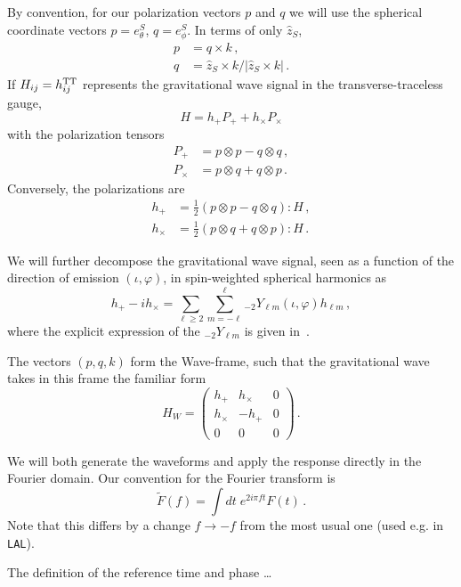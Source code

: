\documentclass[aps,showpacs,twocolumn,prd,superscriptaddress,nofootinbib]{revtex4-1}
\newcommand{\be}{\begin{equation}}
\newcommand{\ee}{\end{equation}}
\newcommand{\bsub}{\begin{subequations}}
\newcommand{\esub}{\end{subequations}}
\begin{document}
By convention, for our polarization vectors $p$ and $q$ we will use the spherical coordinate vectors $p = e_{\theta}^{S}$, $q = e_{\phi}^{S}$. In terms of only $\hat{z}_{S}$,
\bsub
\begin{align}
	p &= q \times k \,,\\
	q &= \hat{z}_{S} \times k / |\hat{z}_{S} \times k|\,.
\end{align}
\esub
If $H_{ij} = h_{ij}^{\rm TT}$ represents the gravitational wave signal in the transverse-traceless gauge,
\be
	H = h_{+} P_{+} + h_{\times} P_{\times}
\ee
with the polarization tensors
\bsub
\begin{align}
	P_{+} &= p \otimes p - q \otimes q \,,\\
	P_{\times} &= p \otimes q + q \otimes p \,.
\end{align}
\esub
Conversely, the polarizations are
\bsub
\begin{align}
	h_{+} &= \frac{1}{2} \left(p \otimes p - q \otimes q \right) : H \,,\\
	h_{\times} &= \frac{1}{2} \left( p \otimes q + q \otimes p \right) : H \,.
\end{align}
\esub

We will further decompose the gravitational wave signal, seen as a function of the direction of emission $(\iota, \varphi)$, in spin-weighted spherical harmonics as
\be\label{eq:hpcmodes}
	h_{+} - i h_{\times} = \sum_{\ell \geq 2} \sum_{m = -\ell}^{\ell} {}_{-2}Y_{\ell m} (\iota, \varphi) h_{\ell m} \,,
\ee
where the explicit expression of the ${}_{-2}Y_{\ell m}$ is given in~\cite{}.

The vectors $(p,q,k)$ form the Wave-frame, such that the gravitational wave takes in this frame the familiar form
\be
	H_{W} = \begin{pmatrix}
		h_{+} & h_{\times} & 0 \\
		h_{\times} & -h_{+} & 0 \\
		0 & 0 & 0
		\end{pmatrix} \,.
\ee

We will both generate the waveforms and apply the response directly in the Fourier domain. Our convention for the Fourier transform is
\be\label{eq:defFourier}
	\tilde{F}(f) = \int dt \; e^{2 i \pi f t} F(t) \,.
\ee
Note that this differs by a change $f\rightarrow -f$ from the most usual one (used e.g. in \texttt{LAL}).

The definition of the reference time and phase \dots

\end{document}
